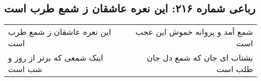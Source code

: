 \begin{center}
\section*{رباعی شماره ۲۱۶: این نعره عاشقان ز شمع طرب است}
\label{sec:0216}
\begin{longtable}{l p{0.5cm} r}
این نعره عاشقان ز شمع طرب است
&&
شمع آمد و پروانه خموش این عجب است
\\
اینک شمعی که برتر از روز و شب است
&&
بشتاب ای جان که شمع دل جان طلب است
\\
\end{longtable}
\end{center}
